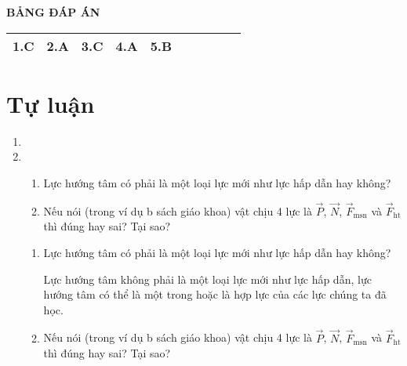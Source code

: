 \whiteBGstarEnd

\loigiai
{
	\begin{center}
		\textbf{BẢNG ĐÁP ÁN}
	\end{center}
	\begin{center}
		\begin{tabular}{|m{2.8em}|m{2.8em}|m{2.8em}|m{2.8em}|m{2.8em}|m{2.8em}|m{2.8em}|m{2.8em}|m{2.8em}|m{2.8em}|}
			\hline
			1.C  & 2.A  & 3.C  & 4.A  & 5.B  & & & & &  \\
			\hline
			
		\end{tabular}
	\end{center}
}
\section{Tự luận}
\begin{enumerate}[label=\bfseries Câu \arabic*:]
	\item {}
	
	
	
	\item {}
	
	\cauhoi
	{\begin{enumerate}
			\item Lực hướng tâm có phải là một loại lực mới như lực hấp dẫn hay không?
			\item Nếu nói (trong ví dụ b sách giáo khoa) vật chịu 4 lực là $\vec P$, $\vec N$, $\vec F_\text{msn}$ và $\vec F_\text{ht}$ thì đúng hay sai? Tại sao?
		\end{enumerate}
	}
	
	\loigiai
	{\begin{enumerate}
			\item Lực hướng tâm có phải là một loại lực mới như lực hấp dẫn hay không?
			
			Lực hướng tâm không phải là một loại lực mới như lực hấp dẫn, lực hướng tâm có thể là một trong hoặc là hợp lực của các lực chúng ta đã học.
			
			\item Nếu nói (trong ví dụ b sách giáo khoa) vật chịu 4 lực là $\vec P$, $\vec N$, $\vec F_\text{msn}$ và $\vec F_\text{ht}$ thì đúng hay sai? Tại sao?
			

\end{enumerate}}
\end{enumerate}
